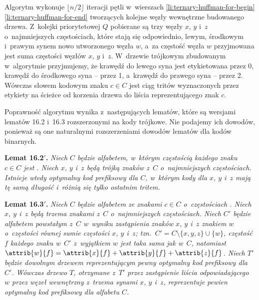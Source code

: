Algorytm wykonuje $\lfloor n/2\rfloor$ iteracji pętli  w~wierszach \ref{li:ternary-huffman-for-begin}\nbendash\ref{li:ternary-huffman-for-end} tworzących kolejne węzły wewnętrzne budowanego drzewa.
Z~kolejki priorytetowej $Q$ pobierane są trzy węzły $x$, $y$ i~$z$ o~najmniejszych częstościach, które stają się odpowiednio, lewym, środkowym i~prawym synem nowo utworzonego węzła $w$, a~za częstość węzła $w$ przyjmowana jest suma częstości węzłów $x$, $y$ i~$z$.
W~drzewie trójkowym zbudowanym w~algorytmie przyjmujemy, że krawędź do lewego syna jest etykietowana przez 0, krawędź do środkowego syna -- przez 1, a~krawędź do prawego syna -- przez 2.
Wówczas słowem kodowym znaku $c\in C$ jest ciąg tritów wyznaczonych przez etykiety na ścieżce od korzenia drzewa do liścia reprezentującego znak $c$.

Poprawność algorytmu  wynika z~następujących lematów, które są wersjami lematów 16.2 i~16.3 rozszerzonymi na kody trójkowe.
Nie podajemy ich dowodów, ponieważ są one naturalnymi rozszerzeniami dowodów lematów dla kodów binarnych.

\bigskip
\noindent\textsf{\textbf{Lemat 16.2\/$'$.}} \textit{Niech\/ $C$ będzie alfabetem, w~którym częstością każdego znaku\/ $c\in C$ jest\/ .
Niech\/ $x$,\/ $y$ i\/~$z$ będą trójką znaków z\/~$C$ o~najmniejszych częstościach.
Istnieje wtedy optymalny kod prefiksowy dla\/ $C$, w~którym kody dla\/ $x$,\/ $y$ i\/~$z$ mają tę samą długość i~różnią się tylko ostatnim tritem.}

\bigskip
\noindent\textsf{\textbf{Lemat 16.3\/$'$.}} \textit{Niech\/ $C$ będzie alfabetem ze znakami\/ $c\in C$ o~częstościach\/ .
Niech\/ $x$,\/ $y$ i\/~$z$ będą trzema znakami z\/~$C$ o~najmniejszych częstościach.
Niech\/ $C'$ będzie alfabetem powstałym z\/~$C$ w~wyniku zastąpienia znaków\/ $x$,\/ $y$ i\/~$z$ znakiem\/ $w$ o~częstości równej sumie częstości\/ $x$,\/ $y$ i\/~$z$; tzn.\/\ $C'=C\setminus\{x,y,z\}\cup\{w\}$, częstość\/ $f$ każdego znaku w\/~$C'$ z~wyjątkiem\/ $w$ jest taka sama jak w\/~$C$, natomiast\/ $\attrib{w}{f}=\attrib{x}{f}+\attrib{y}{f}+\attrib{z}{f}$.
Niech\/ $T'$ będzie dowolnym drzewem reprezentującym pewny optymalny kod prefiksowy dla\/ $C'$.
Wówczas drzewo\/ $T$, otrzymane z\/~$T'$ przez zastąpienie liścia odpowiadającego\/ $w$ przez węzeł wewnętrzny z~trzema synami\/ $x$,\/ $y$ i\/~$z$, reprezentuje pewien optymalny kod prefiksowy dla alfabetu\/ $C$.}

\exercise %

